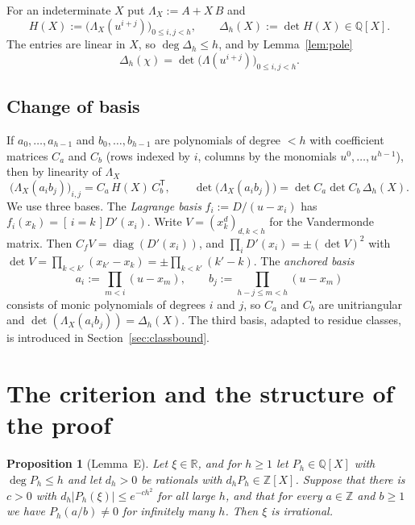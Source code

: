 \documentclass[11pt]{amsart}
\newtheorem{proposition}[theorem]{Proposition}
\theoremstyle{definition}
\theoremstyle{remark}
\numberwithin{equation}{section}
\newcommand{\ZZ}{\mathbb{Z}}
\newcommand{\QQ}{\mathbb{Q}}
\newcommand{\RR}{\mathbb{R}}
\newcommand{\ind}[1]{[\,#1\,]}
\begin{document}
For an indeterminate $X$ put $\Lambda_X:=A+X\,B$ and
\[
  H(X):=\bigl(\Lambda_X(u^{i+j})\bigr)_{0\le i,j<h},\qquad \Delta_h(X):=\det H(X)\in\QQ[X].
\]
The entries are linear in $X$, so $\deg\Delta_h\le h$, and by Lemma~\ref{lem:pole}
\begin{equation}\label{eq:value}
  \Delta_h(\chi)=\det\bigl(\Lambda(u^{i+j})\bigr)_{0\le i,j<h}.
\end{equation}

\subsection{Change of basis}
If $a_0,\dots,a_{h-1}$ and $b_0,\dots,b_{h-1}$ are polynomials of degree $<h$ with coefficient matrices $C_a$ and $C_b$
(rows indexed by $i$, columns by the monomials $u^0,\dots,u^{h-1}$), then by linearity of $\Lambda_X$
\begin{equation}\label{eq:gram}
  \bigl(\Lambda_X(a_ib_j)\bigr)_{i,j}=C_a\,H(X)\,C_b^{\mathsf T},\qquad
  \det\bigl(\Lambda_X(a_ib_j)\bigr)=\det C_a\det C_b\,\Delta_h(X).
\end{equation}
We use three bases. The \emph{Lagrange basis} $f_i:=D/(u-x_i)$ has $f_i(x_k)=\ind{i=k}D'(x_i)$. Write $V=(x_k^d)_{d,k<h}$
for the Vandermonde matrix. Then $C_fV=\operatorname{diag}(D'(x_i))$, and
$\prod_iD'(x_i)=\pm(\det V)^2$ with $\det V=\prod_{k<k'}(x_{k'}-x_k)=\pm\prod_{k<k'}(k'-k)$. The \emph{anchored basis}
\[
  a_i:=\prod_{m<i}(u-x_m),\qquad b_j:=\prod_{h-j\le m<h}(u-x_m)
\]
consists of monic polynomials of degrees $i$ and $j$, so $C_a$ and $C_b$ are unitriangular and
$\det(\Lambda_X(a_ib_j))=\Delta_h(X)$. The third basis, adapted to residue classes, is introduced in
Section~\ref{sec:classbound}.

\section{The criterion and the structure of the proof}\label{sec:criterion}

\begin{proposition}[Lemma~E]\label{prop:criterion}
Let $\xi\in\RR$, and for $h\ge1$ let $P_h\in\QQ[X]$ with $\deg P_h\le h$ and let $d_h>0$ be rationals with
$d_hP_h\in\ZZ[X]$. Suppose that there is $c>0$ with $d_h|P_h(\xi)|\le e^{-ch^2}$ for all large $h$, and that for
every $a\in\ZZ$ and $b\ge1$ we have $P_h(a/b)\ne0$ for infinitely many $h$. Then $\xi$ is irrational.
\end{proposition}
\end{document}
